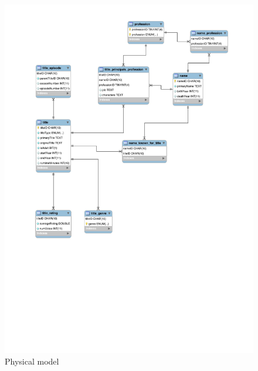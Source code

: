 \documentclass[12pt,a4paper]{article}
\begin{document}
\begin{figure}[ht]
    \includegraphics[width=\linewidth]{images/Lab3/IMDB_DB_Model.jpg}
    \caption{Physical model}
    \label{fig:Physical model}
  \end{figure}
\end{document}
